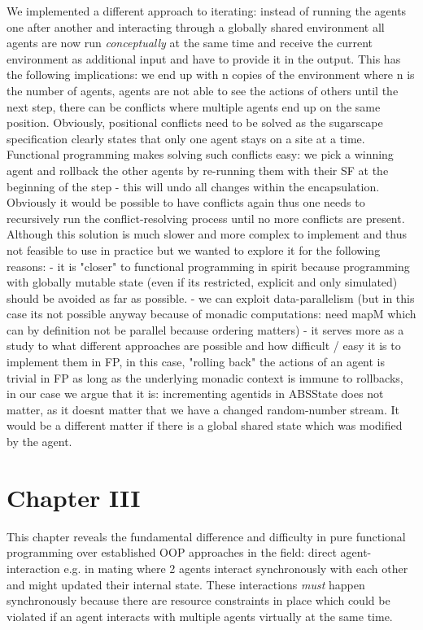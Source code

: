 We implemented a different approach to iterating: instead of running the agents one after another and interacting through a globally shared environment all agents are now run \textit{conceptually} at the same time and receive the current environment as additional input and have to provide it in the output. This has the following implications: we end up with n copies of the environment where n is the number of agents, agents are not able to see the actions of others until the next step, there can be conflicts where multiple agents end up on the same position. 
Obviously, positional conflicts need to be solved as the sugarscape specification clearly states that only one agent stays on a site at a time. Functional programming makes solving such conflicts easy: we pick a winning agent and rollback the other agents by re-running them with their SF at the beginning of the step - this will undo all changes within the encapsulation. Obviously it would be possible to have conflicts again thus one needs to recursively run the conflict-resolving process until no more conflicts are present.
Although this solution is much slower and more complex to implement and thus not feasible to use in practice but we wanted to explore it for the following reasons:
- it is "closer" to functional programming in spirit because programming with globally mutable state (even if its restricted, explicit and only simulated) should be avoided as far as possible.
- we can exploit data-parallelism (but in this case its not possible anyway because of monadic computations: need mapM which can by definition not be parallel because ordering matters)
- it serves more as a study to what different approaches are possible and how difficult / easy it is to implement them in FP, in this case, "rolling back" the actions of an agent is trivial in FP as long as the underlying monadic context is immune to rollbacks, in our case we argue that it is: incrementing agentids in ABSState does not matter, as it doesnt matter that we have a changed random-number stream. It would be a different matter if there is a global shared state which was modified by the agent.

\section{Chapter III}
This chapter reveals the fundamental difference and difficulty in pure functional programming over established OOP approaches in the field: direct agent-interaction e.g. in mating where 2 agents interact synchronously with each other and might updated their internal state. These interactions \textit{must} happen synchronously because there are resource constraints in place which could be violated if an agent interacts with multiple agents virtually at the same time.

